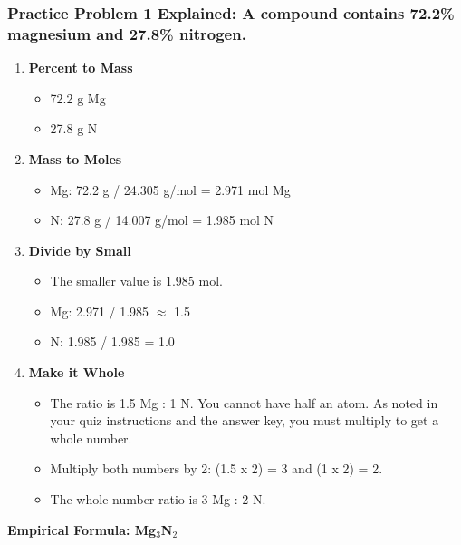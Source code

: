 \documentclass{article}
\begin{document}
\subsubsection*{Practice Problem 1 Explained: A compound contains 72.2\% magnesium and 27.8\% nitrogen.}
\begin{enumerate}[label=Step \arabic*:, itemsep=5pt]
    \item \textbf{Percent to Mass}
    \begin{itemize}
        \item 72.2 g Mg
        \item 27.8 g N
    \end{itemize}
    \item \textbf{Mass to Moles}
    \begin{itemize}
        \item Mg: 72.2 g / 24.305 g/mol = 2.971 mol Mg
        \item N: 27.8 g / 14.007 g/mol = 1.985 mol N
    \end{itemize}
    \item \textbf{Divide by Small}
    \begin{itemize}
        \item The smaller value is 1.985 mol.
        \item Mg: 2.971 / 1.985 $\approx$ 1.5
        \item N: 1.985 / 1.985 = 1.0
    \end{itemize}
    \item \textbf{Make it Whole}
    \begin{itemize}
        \item The ratio is 1.5 Mg : 1 N. You cannot have half an atom. As noted in your quiz instructions and the answer key, you must multiply to get a whole number.
        \item Multiply both numbers by 2: (1.5 x 2) = 3 and (1 x 2) = 2.
        \item The whole number ratio is 3 Mg : 2 N.
    \end{itemize}
\end{enumerate}
\textbf{Empirical Formula: Mg$_3$N$_2$}
\end{document}
